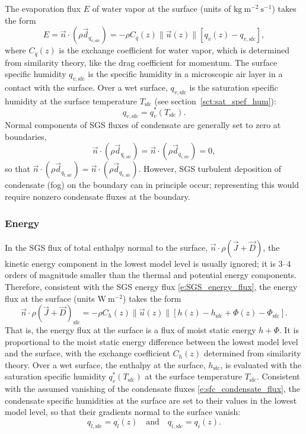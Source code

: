 \documentclass{report}
\begin{document}
The evaporation flux $E$ of water vapor at the surface (units of $\mathrm{kg~m^{-2}~s^{-1}}$) takes the form 
\begin{equation}\label{e:sfc_evaporation}
E = \vec{n} \cdot (\rho \vec{d}_{q_{v, \mathrm{sfc}}}) = - \rho C_q(z) \| \vec{u}(z) \| \left[q_{v}(z) - q_{v, \mathrm{sfc}} \right],
\end{equation} 
where $C_q(z)$ is the exchange coefficient for water vapor, which is determined from similarity theory, like the drag coefficient for momentum. The surface specific humidity $q_{v, \mathrm{sfc}}$ is the specific humidity in a microscopic air layer in a contact with the surface. Over a wet surface, $q_{v, \mathrm{sfc}}$ is the saturation specific humidity at the surface temperature $T_\mathrm{sfc}$ (see section~\ref{sct:sat_spef_hum}): 
\[
q_{v, \mathrm{sfc}}=q_v^*(T_\mathrm{sfc}).
\]
Normal components of SGS fluxes of condensate are generally set to zero at boundaries,
\begin{equation}\label{e:sfc_condensate_flux}
\vec{n} \cdot (\rho \vec{d}_{q_{l, \mathrm{sfc}}}) = \vec{n} \cdot (\rho \vec{d}_{q_{i, \mathrm{sfc}}}) = 0,
\end{equation}
so that $\vec{n} \cdot (\rho \vec{d}_{q_{t, \mathrm{sfc}}}) = \vec{n} \cdot (\rho \vec{d}_{q_{v, \mathrm{sfc}}})$. However, SGS turbulent deposition of condensate (fog) on the boundary can in principle occur; representing this would require nonzero condensate fluxes at the boundary. 

\subsubsection{Energy}

In the SGS flux of total enthalpy normal to the surface, $\vec{n} \cdot \rho (\vec{J} + \vec{D})$, the kinetic energy component in the lowest model level is usually ignored; it is 3--4 orders of magnitude smaller than the thermal and potential energy components. Therefore, consistent with the SGS energy flux \eqref{e:SGS_energy_flux}, the energy flux at the surface (units $\mathrm{W~m^{-2}}$) takes the form
\begin{equation}\label{e:sfc_energy_flux}
\vec{n} \cdot \rho (\vec{J} + \vec{D})_\mathrm{sfc} = -\rho C_h(z) \| \vec{u}(z) \| \left[ h(z) - h_\mathrm{sfc} + \Phi(z) - \Phi_\mathrm{sfc} \right].
\end{equation}
That is, the energy flux at the surface is a flux of moist static energy $h + \Phi$. It is proportional to the moist static energy  difference between the lowest model level and the surface, with the exchange coefficient $C_h(z)$ determined from similarity theory. Over a wet surface, the enthalpy at the surface, $h_\mathrm{sfc}$, is evaluated with the saturation specific humidity $q_v^*(T_\mathrm{sfc})$ at the surface temperature $T_\mathrm{sfc}$. Consistent with the assumed vanishing of the condensate fluxes \eqref{e:sfc_condensate_flux}, the condensate specific humidities at the surface are set to their values in the lowest model level, so that their gradients normal to the surface vanish:
\[
q_{l, \mathrm{sfc}} = q_l(z) \quad \text{and} \quad q_{i, \mathrm{sfc}} = q_i(z).
\]
\end{document}
